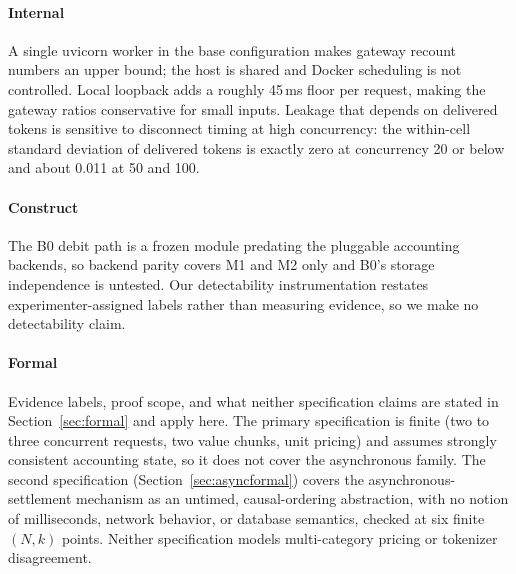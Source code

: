 \documentclass[manuscript,review,anonymous]{acmart}
\begin{document}
\paragraph{Internal}
A single uvicorn worker in the base configuration makes gateway recount numbers an upper
bound; the host is shared and Docker scheduling is not controlled. Local loopback adds a
roughly 45\,ms floor per request, making the gateway ratios conservative for small
inputs. Leakage that depends on delivered tokens is sensitive to
disconnect timing at high concurrency: the within-cell standard deviation of delivered
tokens is exactly zero at concurrency 20 or below and about 0.011 at 50 and 100.

\paragraph{Construct}
The B0 debit path is a frozen module predating the pluggable accounting backends, so
backend parity covers M1 and M2 only and B0's storage independence is untested. Our detectability instrumentation restates
experimenter-assigned labels rather than measuring evidence, so we make no detectability
claim.

\paragraph{Formal}
Evidence labels, proof scope, and what neither specification claims are stated in
Section~\ref{sec:formal} and apply here. The primary specification is
finite (two to three concurrent requests, two value chunks, unit pricing) and assumes
strongly consistent accounting state, so it does not cover the asynchronous family. The
second specification (Section~\ref{sec:asyncformal}) covers the asynchronous-settlement
mechanism as an untimed, causal-ordering abstraction, with no notion of milliseconds,
network behavior, or database semantics, checked at six finite $(N,k)$ points. Neither
specification models multi-category pricing or tokenizer disagreement.
\end{document}
